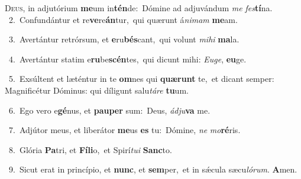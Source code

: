 \lettrine{\initial\textcolor{\initialcolor}{D}}{eus,} in adjutórium \textbf{me}\-um in\-\textbf{tén}\-de:~\star Dómine ad adjuvándum \textit{me} \textit{fes}\-\textbf{tí}na.\\
{\numbfont\textcolor{\numbcolor}{~2.}}~Confundántur et re\-\textbf{ve}\-re\-\textbf{án}\-tur,~\star qui quærunt á\-\textit{ni}\-\textit{mam} \textbf{me}\-am.\par
{\numbfont\textcolor{\numbcolor}{~3.}}~Avertántur retrórsum, et \textbf{e}\-ru\-\textbf{bés}\-cant,~\star qui volunt \textit{mi}\-\textit{hi} \textbf{ma}\-la.\par
{\numbfont\textcolor{\numbcolor}{~4.}}~Avertántur statim e\-\textbf{ru}\-be\-\textbf{scén}\-tes,~\star qui dicunt mihi: \textit{Eu}\-\textit{ge}, \textbf{eu}\-ge.\par
{\numbfont\textcolor{\numbcolor}{~5.}}~Exsúltent et læténtur in te \textbf{om}\-nes qui \textbf{quæ}\-\textbf{runt} te,~\star et dicant semper: Magnificétur Dóminus: qui díligunt salu\-\textit{tá}\-\textit{re} \textbf{tu}\-um.\par
{\numbfont\textcolor{\numbcolor}{~6.}}~Ego vero e\-\textbf{gé}\-nus, et \textbf{pau}\-\textbf{per} sum:~\star Deus, \textit{ád}\-\textit{ju}\textbf{va} me.\par
{\numbfont\textcolor{\numbcolor}{~7.}}~Adjútor meus, et liberátor \textbf{me}\-us \textbf{es} tu:~\star Dómine, \textit{ne} \textit{mo}\-\textbf{ré}ris.\par
{\numbfont\textcolor{\numbcolor}{~8.}}~Glória \textbf{Pa}\-tri, et \textbf{Fí}\-\textbf{li}o,~\star et Spirí\-\textit{tu}\-\textit{i} \textbf{Sanc}\-to.\par
{\numbfont\textcolor{\numbcolor}{~9.}}~Sicut erat in princípio, et \textbf{nunc}\-, et \textbf{sem}\-per,~\star et in sǽcula sæcu\-\textit{ló}\-\textit{rum}. \textbf{A}\-men.\par
